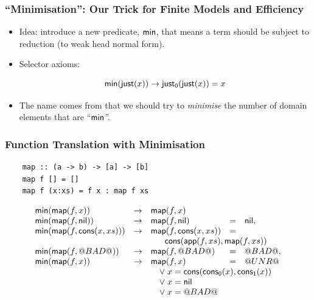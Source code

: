 \documentclass[serif,professionalfont]{beamer}
\begin{document}
\begin{frame}
  \frametitle{``Minimisation'': Our Trick for Finite Models and Efficiency }

  \begin{itemize}
    \item Idea: introduce a new predicate, $\mathsf{min}$, that means a term
      should be subject to reduction (to weak head normal form).

    \item Selector axioms:

      $$
        \mathsf{min}(\mathsf{just}(x)) \to \mathsf{just_0}(\mathsf{just}(x)) = x
      $$

    \item The name comes from that we should try to \emph{minimise}
      the number of domain elements that are ``$\mathsf{min}$''.
  \end{itemize}

\end{frame}

\begin{frame}[fragile]
  \frametitle{Function Translation with Minimisation}

  \begin{verbatim}
    map :: (a -> b) -> [a] -> [b]
    map f [] = []
    map f (x:xs) = f x : map f xs
  \end{verbatim}

  \newcommand\mmap[2]{
    \Min(\map{#1}{#2}) & \to & \map{#1}{#2}
  }

  \[\begin{array}{lllll}
  \Min(\map{f}{x}) & \to & \map{f}{x} & & \\
  \mmap{f}{\nil}         & = & \nil, \\
  \mmap{f}{\cons{x}{xs}} & = & \\
  & & \multicolumn{3}{c}{\cons{\app{f}{xs}}{\map{f}{xs}}}  \\
  \mmap{f}{\bad}         & = & \bad, \\
  \mmap{f}{x}            & = & \unr \\
  & & \multicolumn{3}{l}{\quad \lor \; x = \cons{\conspi{x}}{\conspii{x}}} \\
  & & \multicolumn{3}{l}{\quad \lor \; x = \nil} \\
  & & \multicolumn{3}{l}{\quad \lor \; x = \bad} \\
  \end{array}\]
\end{frame}
\end{document}

